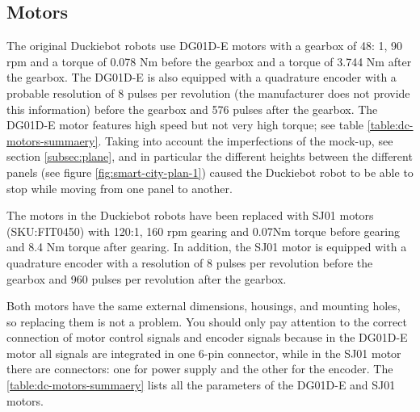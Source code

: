 \documentclass[conference]{IEEEtran}
\begin{document}
\subsection{Motors}
The original Duckiebot robots use DG01D-E motors with a gearbox of 48: 1, 90 rpm and a torque of 0.078 Nm before the gearbox and a torque of 3.744 Nm after the gearbox.
The DG01D-E is also equipped with a quadrature encoder with a probable resolution of 8 pulses per revolution (the manufacturer does not provide this information) before the gearbox and 576 pulses after the gearbox. The DG01D-E motor features high speed but not very high torque; see table \ref{table:dc-motors-summaery}. Taking into account the imperfections of the mock-up, see section \ref{subsec:plane}, and in particular the different heights between the different panels (see figure \ref{fig:smart-city-plan-1}) caused the Duckiebot robot to be able to stop while moving from one panel to another.

The motors in the Duckiebot robots have been replaced with SJ01 motors (SKU:FIT0450) with 120:1, 160 rpm gearing and 0.07Nm torque before gearing and 8.4 Nm torque after gearing. In addition, the SJ01 motor is equipped with a quadrature encoder with a resolution of 8 pulses per revolution before the gearbox and 960 pulses per revolution after the gearbox.  

Both motors have the same external dimensions, housings, and mounting holes, so replacing them is not a problem. You should only pay attention to the correct connection of motor control signals and encoder signals because in the DG01D-E motor all signals are integrated in one 6-pin connector, while in the SJ01 motor there are connectors: one for power supply and the other for the encoder. The \ref{table:dc-motors-summaery} lists all the parameters of the DG01D-E and SJ01 motors.  
\end{document}
